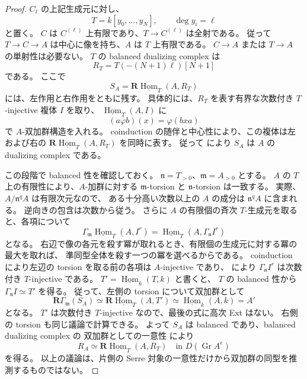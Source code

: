 \begin{proof}
$C_\ell$ の上記生成元に対し、
\[
 T=k[y_0,\ldots,y_N],\qquad \deg y_i=\ell
\]
と置く。
$C$ は $C^{(\ell)}$ 上有限であり、$T\to C^{(\ell)}$ は全射である。
従って $T\to C\to A$ は中心に像を持ち、$A$ は $T$ 上有限である。
$C\to A$ または $T\to A$ の単射性は必要ない。
$T$ の balanced dualizing complex は
\[
 R_T=T(-(N+1)\ell)[N+1]
\]
である。
ここで
\[
 S_A=\mathbf R\underline{\operatorname{Hom}}_T(A,R_T)
\]
には、左作用と右作用をともに残す。
具体的には、$R_T$ を表す有界な次数付き $T$-injective 複体 $I$ を取り、
$\underline{\operatorname{Hom}}_T(A,I)$ に
\[
 (a\varphi b)(x)=\varphi(bxa)
\]
で $A$-双加群構造を入れる。
coinduction の随伴と中心性により、この複体は左および右の
$\mathbf R\underline{\operatorname{Hom}}_T(A,R_T)$ を同時に表す。
従って \cite[Proposition~5.2]{YekutieliBalanced} により
$S_A$ は $A$ の dualizing complex である。

この段階で balanced 性を確認しておく。
$\mathfrak n=T_{>0}$、$\mathfrak m=A_{>0}$ とする。
$A$ の $T$ 上の有限性により、$A$-加群に対する
$\mathfrak m$-torsion と $\mathfrak n$-torsion は一致する。
実際、$A/\mathfrak n^q A$ は有限次元なので、
ある十分高い次数以上の $A$ の成分は $\mathfrak n^qA$ に含まれる。
逆向きの包含は次数から従う。
さらに $A$ の有限個の斉次 $T$-生成元を取ると、各項について
\[
 \Gamma_{\mathfrak m}
    \underline{\operatorname{Hom}}_T(A,I^r)
 =\underline{\operatorname{Hom}}_T
    (A,\Gamma_{\mathfrak n}I^r)
\]
となる。
右辺で像の各元を殺す冪が取れるとき、有限個の生成元に対する冪の最大を取れば、
準同型全体を殺す一つの冪を選べるからである。
coinduction により左辺の torsion を取る前の各項は $A$-injective であり、
\cite[Proposition~4.6]{YekutieliBalanced} により
$\Gamma_{\mathfrak n}I^r$ は次数付き $T$-injective である。
$T'=\underline{\operatorname{Hom}}_k(T,k)$ と書くと、
$T$ の balanced 性から
$\Gamma_{\mathfrak n}I\simeq T'$ を得る。
従って、左側の torsion について双加群として
\[
 \mathbf R\Gamma_{\mathfrak m}(S_A)
 \simeq\mathbf R\underline{\operatorname{Hom}}_T(A,T')
 \simeq\underline{\operatorname{Hom}}_k(A,k)=A'
\]
となる。
$T'$ は次数付き $T$-injective なので、最後の式に高次 Ext はない。
右側の torsion も同じ議論で計算できる。
よって $S_A$ は balanced であり、balanced dualizing complex の
双加群としての一意性
\cite[Definition~4.1 の直後、p.~57]{YekutieliBalanced} により
\begin{equation}\label{eq:field-central-polynomial-duality}
 R_A\simeq
 \mathbf R\underline{\operatorname{Hom}}_T(A,R_T)
 \quad\text{in }D(\operatorname{Gr}A^e)
\end{equation}
を得る。
以上の議論は、片側の Serre 対象の一意性だけから双加群の同型を推測するものではない。


\end{proof}
